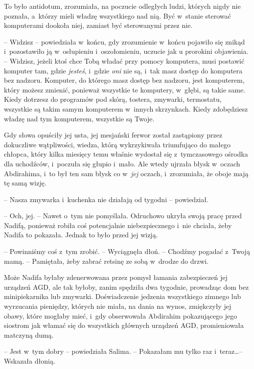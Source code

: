 \documentclass[oneside,polish,11pt,sfheadings]{mwbk}
\begin{document}
To było antidotum, zrozumiała, na poczucie odległych ludzi, których
nigdy nie poznała, a~którzy mieli władzę wszystkiego nad nią. Być w~stanie sterować komputerami dookoła niej, zamiast być sterowanymi przez
nie.

-- Widzisz -- powiedziała w~końcu, gdy zrozumienie w~końcu pojawiło się
znikąd i~pozostawiło ją w~osłupieniu i~oszołomieniu, uczucie jak u
prorokini objawienia. -- Widzisz, jeżeli ktoś chce Tobą władać przy
pomocy komputera, musi postawić komputer tam, gdzie \textit{jesteś}, i~gdzie \textit{oni} nie są, i~tak masz dostęp do komputera bez nadzoru.
Komputer, do którego masz dostęp bez nadzoru, jest komputerem, który
możesz zmienić, ponieważ wszystkie te komputery, w~głębi, są takie same.
Kiedy dotrzesz do programów pod skórą, tostera, zmywarki, termostatu,
wszystkie są takim samym komputerem w~innych skrzynkach. Kiedy
zdobędziesz władzę nad tym komputerem, wszystkie są Twoje.

Gdy słowa opuściły jej usta, jej mesjański ferwor został zastąpiony
przez dokuczliwe wątpliwości, wiedza, którą wykrzykiwała triumfująco do
małego chłopca, który kilka miesięcy temu właśnie wydostał się z~tymczasowego ośrodka dla uchodźców, i~poczuła się głupio i~mało. Ale
wtedy ujrzała błysk w~oczach Abdirahima, i~to był ten sam błysk co w~\textit{jej} oczach, i~zrozumiała, że oboje mają tę samą wizję.

-- Nasza zmywarka i~kuchenka nie działają od tygodni -- powiedział.

-- Och, jej. -- Nawet o~tym nie pomyślała. Odruchowo ukryła swoją pracę
przed Nadifą, ponieważ robiła coś potencjalnie niebezpiecznego i~nie
chciała, żeby Nadifa to pokazała. Jednak to było przed jej wizją. 

-- Powinniśmy coś z~tym zrobić. -- Wyciągnęła dłoń. -- Chodźmy pogadać z~Twoją mamą. -- Pamiętała, żeby zabrać retsinę ze sobą w~drodze do drzwi.

Może Nadifa byłaby zdenerwowana przez pomysł łamania zabezpieczeń jej
urządzeń AGD, ale tak byłoby, zanim spędziła dwa tygodnie, prowadząc dom
bez minipiekarnika lub zmywarki. Doświadczenie jedzenia wszystkiego
zimnego lub wyrzucania pieniędzy, których nie miała, na dania na wynos,
zmiękczyły jej obawy, które mogłaby mieć, i~gdy obserwowała Abdirahim
pokazującego jego siostrom jak włamać się do wszystkich głównych
urządzeń AGD, promieniowała matczyną dumą.

-- Jest w~tym dobry -- powiedziała Salima. -- Pokazałam mu tylko raz i~teraz\ldots  -- Wskazała dłonią.
\end{document}
